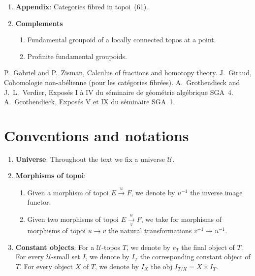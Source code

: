 \documentclass[10pt,oneside]{amsart}
\newcommand{\oldpage}[1]{\marginnote{\textbf{#1}}}
\newcommand{\cal}{\mathcal}
\begin{document}
\begin{enumerate}[label=\arabic*.]
    I removed it in the corollary of Proposition~4.6.2, which directly describes the locally constant objects of the inductive limit.
    The advantage of the form (4.5) is to allow explicit calculations, which are developed in the points 4.6.3 and 4.6.7.
  \item[A.] \textbf{Appendix}: Categories fibred in topoi~(61).
  \item \textbf{Complements}
    \begin{enumerate}[label=5.\arabic*.]
      \item Fundamental groupoid of a locally connected topos at a point.
      \item Profinite fundamental groupoids.
    \end{enumerate}
\end{enumerate}

\begin{thebibliography}{4}
   P.~Gabriel and P.~Zisman, {Calculus of fractions and homotopy theory}.
   J.~Giraud, {Cohomologie non-ab\'elienne (pour les cat\'egories fibr\'ees)}.
   A.~Grothendieck and J.~L.~Verdier, {Expos\'es I \`a IV du s\'eminaire de g\'eom\'etrie alg\'ebrique SGA~4}.
   A.~Grothendieck, {Expos\'es V et IX du s\'eminaire SGA~1}.
\end{thebibliography}

\section*{Conventions and notations}
\oldpage{III}
\begin{enumerate}[label=(\arabic*)]
  \item \textbf{Universe}: Throughout the text we fix a universe $\cal{U}$.
  \item \textbf{Morphisms of topoi}:
    \begin{enumerate}[label=(\alph*)]
      \item Given a morphism of topoi $E\xrightarrow{u}F$, we denote by $u^{-1}$ the inverse image functor.
      \item Given two morphisms of topoi $E\xrightarrow[v]{u}F$, we take for morphisms of morphisms of topoi $u\to v$ the natural transformations $v^{-1}\to u^{-1}$.
    \end{enumerate}
  \item \textbf{Constant objects}: For a $\cal{U}$-topos $T$, we denote by $e_T$ the final object of $T$.
    For every $\cal{U}$-small set $I$, we denote by $I_T$ the corresponding constant object of $T$.
    For every object $X$ of $T$, we denote by $I_X$ the obj $I_{T/X}=X\times I_T$.
\end{enumerate}
\end{document}
